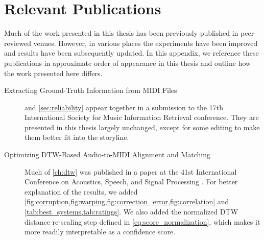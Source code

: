 \chapter{Relevant Publications}

Much of the work presented in this thesis has been previously published in peer-reviewed venues.
However, in various places the experiments have been improved and results have been subsequently updated.
In this appendix, we reference these publications in approximate order of appearance in this thesis and outline how the work presented here differs.

\begin{description}
\item[Extracting Ground-Truth Information from MIDI Files]$\;$\\  and \cref{sec:reliability} appear together in a submission to the 17th International Society for Music Information Retrieval conference.
They are presented in this thesis largely unchanged, except for some editing to make them better fit into the storyline.

\item[Optimizing DTW-Based Audio-to-MIDI Alignment and Matching]$\;$\\ Much of \cref{ch:dtw} was published in a paper at the 41st International Conference on Acoustics, Speech, and Signal Processing \cite{raffel2016optimizing}.
For better explanation of the results, we added \cref{fig:corruption,fig:warping,fig:correction_error,fig:correlation} and \cref{tab:best_systems,tab:ratings}.
We also added the normalized DTW distance re-scaling step defined in \cref{eq:score_normalization}, which makes it more readily interpretable as a confidence score.


\end{description}
